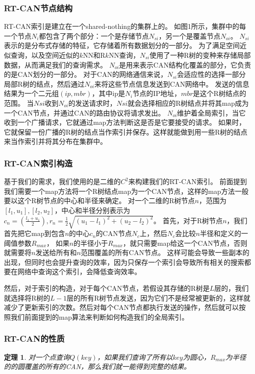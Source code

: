 \documentclass{ML}
\newtheorem{theorem}{\hspace{2em}定理}
\begin{document}
\subsubsection{RT-CAN节点结构}
RT-CAN索引是建立在一个shared-nothing的集群上的。
如图1所示，集群中的每一个节点$N_i$都包含了两个部分：一个是存储节点$N_{si}$，另一个是覆盖节点$N_{oi}$。
$N_{si}$表示的是分布式存储的特征，它存储着所有数据划分的一部分。
为了满足空间近似查询，以及空间近似的$k$NN和R$k$NN查询，$N_{si}$使用了一种R树的变种来存储局部数据，从而满足我们的查询需求。
$N_{oi}$是用来表示CAN结构化覆盖的部分，它负责的是CAN划分的一部分。
对于CAN的网络通信来说，$N_{si}$会适应性的选择一部分局部R树的结点，然后通过$N_{oi}$来将这些节点信息发送到CAN网络中。
发送的信息结果为一个二元组$(ip,mbr)$，其中ip是$N_i$节点的IP地址，$mbr$是这个R树结点的范围。
当$N{si}$收到$N_{oi}$的发送请求时，$N{si}$就会选择相应的R树结点并将其map成为一个CAN节点，并通过CAN的路由协议将请求发出。
$N_{oi}$维护着全局索引，当它收到一个广播请求，它就通过map方法判断这是否是它要接受的请求。
如果时，它就保留一份广播的R树的结点当作索引并保存。这样就能做到用一些R树的结点来当作索引并将其分布在集群中。

\subsubsection{RT-CAN索引构造}
基于我们的需求，我们使用的是二维的$C^2$来构建我们的RT-CAN索引。
前面提到我们需要一个map方法将一个R树结点map为一个CAN节点，这样的map方法一般要以这个R树节点的中心和半径来确定。
对一个二维的R树节点$n$，范围为$[l_1,u_1],[l_2,u_2]$，中心和半径分别表示为$c_n=(\frac{l_1+u_1}{2}),r_n=\frac{1}{2}\sqrt{(u_1-l_1)^2+(u_2-l_2)^2}$。
首先，对于R树节点$n$，我们首先把它map到包含$n$的中心$c_n$的CAN节点$N_c$上，然后$N_c$会比较$n$半径和定义的一阈值参数$R_{max}$，
如果$n$的半径小于$R_{max}$，就只需要map给这一个CAN节点，否则就需要将$n$发送给所有和$n$范围覆盖的所有CAN节点。
这样可能会导致一些副本的出现，但同时也会提升查询的效率，因为只保存一个索引会导致所有相关的搜索都要在网络中查询这个索引，会降低查询效率。

然后，对于索引的构造，对于每个CAN节点，若假设其存储的R树是$L$层的，我们就选择将R树的$L-1$层的所有R树节点发送，因为它们不是经常被更新的，这样就减少了更新索引的次数。然后对每个CAN节点都执行发送的操作，然后就可以按照我们前面提到的map算法来判断如何构造我们的全局索引。

\subsubsection{RT-CAN的性质}
\begin{theorem}\label{theorem:RT-CAN-1}
  对一个点查询$Q(key)$，如果我们查询了所有以$key$为圆心，$R_{max}$为半径的的圆覆盖的所有的CAN，那么我们就一能得到完整的结果。
\end{theorem}
\end{document}
